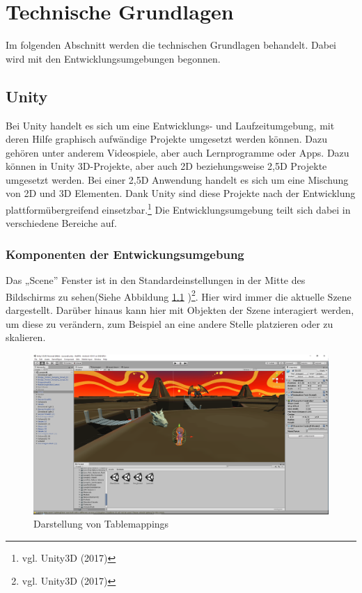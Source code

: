 \chapter{Technische Grundlagen}
	Im folgenden Abschnitt werden die technischen Grundlagen behandelt. Dabei wird mit den Entwicklungsumgebungen begonnen.

\section{Unity}
	Bei Unity handelt es sich um eine Entwicklungs- und Laufzeitumgebung, mit deren Hilfe graphisch aufwändige Projekte umgesetzt werden können. Dazu gehören unter anderem Videospiele, aber auch Lernprogramme oder Apps. Dazu können in Unity 3D-Projekte, aber auch 2D beziehungsweise 2,5D Projekte umgesetzt werden. Bei einer 2,5D Anwendung handelt es sich um eine Mischung von 2D und 3D Elementen. Dank Unity sind diese Projekte nach der Entwicklung plattformübergreifend einsetzbar.\footnote{vgl. Unity3D \cite{unity1} (2017)} Die Entwicklungsumgebung teilt sich dabei in verschiedene Bereiche auf. 
	
	\subsection{Komponenten der Entwickungsumgebung}
		Das „Scene” Fenster ist in den Standardeinstellungen in der Mitte des Bildschirms zu sehen(Siehe Abbildung \ref{scene} )\footnote{vgl. Unity3D \cite{unity2} (2017)}. Hier wird immer die aktuelle Szene dargestellt. Darüber hinaus kann hier mit Objekten der Szene interagiert werden, um diese zu verändern, zum Beispiel an eine andere Stelle platzieren oder zu skalieren.
	
		\begin{figure}[htbp]
			\centering 
			\label{scene}
			\includegraphics[width=\textwidth]{pics/unity3d_ui.png}
			\caption{Darstellung von Tablemappings}
		\end{figure}
	
